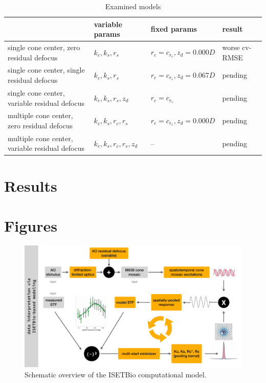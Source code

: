\documentclass[11pt, oneside]{article}   	%
\begin{document}
\begin{table}[h]
\centering
\begin{tabular}{|l | l  l |l |}
\hline
\rowcolor{LightSlateGray!35!Lavender}  \multicolumn{1}{|l|}{\textbf{model description}} & \textbf{variable params} & \textbf{fixed params} & \textbf{result} \\
\hline
\hline
single cone center, zero residual defocus        & $k_c, k_s, r_s$                 &  $r_c = c_{r_c}, z_{d} = 0.000D$ & worse cv-RMSE \\
single cone center, single residual defocus        & $k_c, k_s, r_s$                 &  $r_c = c_{r_c}, z_{d} = 0.067D$ & pending \\
single cone center, variable residual defocus      & $k_c, k_s, r_s, z_{d}$ & $r_c = c_{r_c}$ & pending \\
multiple cone center, zero residual defocus        & $k_c, k_s, r_c, r_s$                 &  $r_c = c_{r_c}, z_{d} = 0.000D$ & pending \\
multiple cone center, variable residual defocus    & $k_c, k_s, r_c, r_s, z_{d}$ & -- &  pending \\
\hline
\end{tabular}
\caption{Examined models}
\label{table:ModelAssessment}
\end{table}

\section{Results}

\section{Figures}

\begin{figure}[htbp] %
   \centering
   \includegraphics[width=7in]{Figures/ModelOverview.pdf} 
   \caption{Schematic overview of the ISETBio computational model.}
   \label{fig:ModelOverview}
\end{figure}
\end{document}
